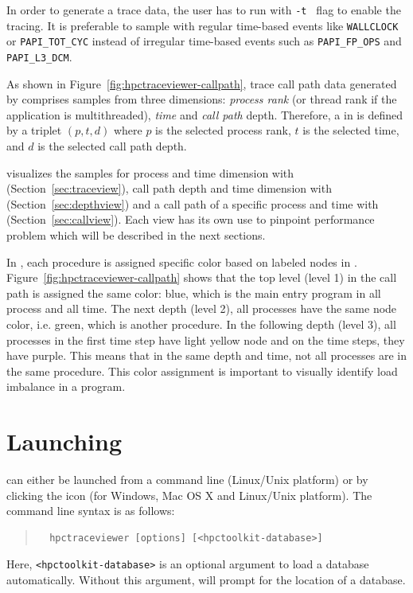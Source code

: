 In order to generate a trace data, the user has to run \hpcrun{} with {\tt -t } flag to enable the tracing. It is preferable to sample with regular time-based events like {\tt WALLCLOCK} or {\tt PAPI\_TOT\_CYC} instead of irregular time-based events such as {\tt PAPI\_FP\_OPS} and {\tt PAPI\_L3\_DCM}.

As shown in Figure~\ref{fig:hpctraceviewer-callpath}, trace call path data generated by \hpcprof{} comprises samples from three dimensions: \emph{process rank} (or thread rank if the application is multithreaded), \emph{time} and \emph{call path} depth.
Therefore, a \emph{\crosshair} in \hpctraceviewer{} is defined by a triplet $(p,t,d)$ where $p$ is the selected process rank, $t$ is the selected time, and $d$ is the selected call path depth. 

\hpctraceviewer{} visualizes the samples for process and time dimension with \emph{\traceview} (Section~\ref{sec:traceview}), call path depth and time dimension with \emph{\depthview} (Section~\ref{sec:depthview}) and a call path of a specific process and time with \emph{\callview} (Section~\ref{sec:callview}).
Each view has its own use to pinpoint performance problem which will be described in the next sections.

In \hpctraceviewer, each procedure is assigned specific color based on labeled nodes in \hpcviewer. Figure~\ref{fig:hpctraceviewer-callpath} shows that the top level (level 1) in the call path is assigned the same color: blue, which is the main entry program in all process and all time.
The next depth (level 2), all processes have the same node color, i.e. green, which is another procedure. 
In the following depth (level 3), all processes in the first time step have light yellow node and on the time steps, they have purple. This means that in the same depth and time, not all processes are in the same procedure.
This color assignment is important to visually identify load imbalance in a program.


\section{Launching}

\hpctraceviewer{} can either be launched from a command line (Linux/Unix platform) or by clicking the \hpctraceviewer{} icon (for Windows, Mac OS X and Linux/Unix platform).
The command line syntax is as follows:
\begin{quote}
\begin{verbatim}
  hpctraceviewer [options] [<hpctoolkit-database>]
\end{verbatim}
\end{quote}
Here, \texttt{<hpctoolkit-database>} is an optional argument to load a database automatically.
Without this argument, \hpctraceviewer{} will prompt for the location of a database.

